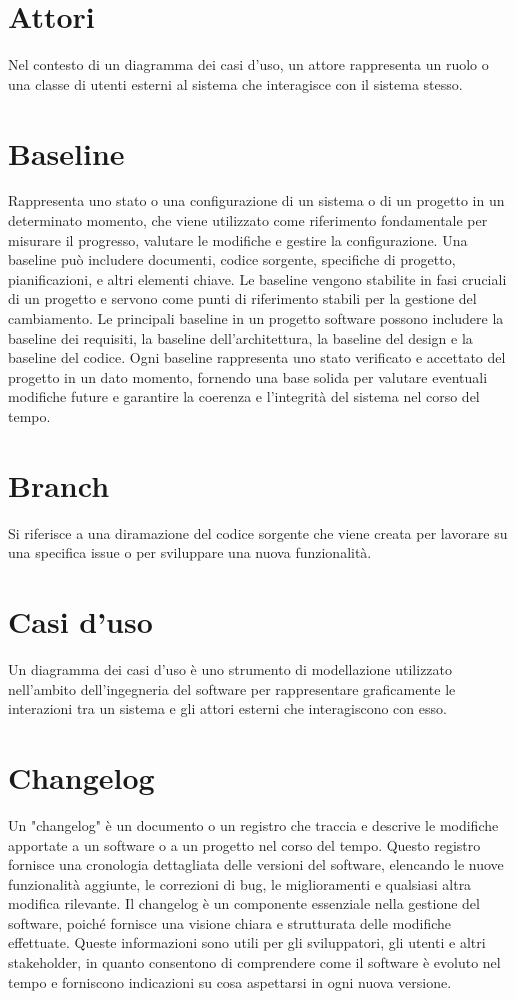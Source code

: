\documentclass{article}
\begin{document}
\section{Attori}
Nel contesto di un diagramma dei casi d'uso, un attore rappresenta un ruolo o una classe di utenti esterni al sistema che interagisce con il sistema stesso.

\section{Baseline}
Rappresenta uno stato o una configurazione di un sistema o di un progetto in un determinato momento, che viene utilizzato come riferimento fondamentale per misurare il progresso, valutare le modifiche e gestire la configurazione. Una baseline può includere documenti, codice sorgente, specifiche di progetto, pianificazioni, e altri elementi chiave.
Le baseline vengono stabilite in fasi cruciali di un progetto e servono come punti di riferimento stabili per la gestione del cambiamento. Le principali baseline in un progetto software possono includere la baseline dei requisiti, la baseline dell'architettura, la baseline del design e la baseline del codice. Ogni baseline rappresenta uno stato verificato e accettato del progetto in un dato momento, fornendo una base solida per valutare eventuali modifiche future e garantire la coerenza e l'integrità del sistema nel corso del tempo.

\section{Branch}
Si riferisce a una diramazione del codice sorgente che viene creata per lavorare su una specifica issue o per sviluppare una nuova funzionalità. 

\section{Casi d'uso}
Un diagramma dei casi d'uso è uno strumento di modellazione utilizzato nell'ambito dell'ingegneria del software per rappresentare graficamente le interazioni tra un sistema e gli attori esterni che interagiscono con esso.

\section{Changelog}
Un "changelog" è un documento o un registro che traccia e descrive le modifiche apportate a un software o a un progetto nel corso del tempo. Questo registro fornisce una cronologia dettagliata delle versioni del software, elencando le nuove funzionalità aggiunte, le correzioni di bug, le miglioramenti e qualsiasi altra modifica rilevante. Il changelog è un componente essenziale nella gestione del software, poiché fornisce una visione chiara e strutturata delle modifiche effettuate. Queste informazioni sono utili per gli sviluppatori, gli utenti e altri stakeholder, in quanto consentono di comprendere come il software è evoluto nel tempo e forniscono indicazioni su cosa aspettarsi in ogni nuova versione.
\end{document}
